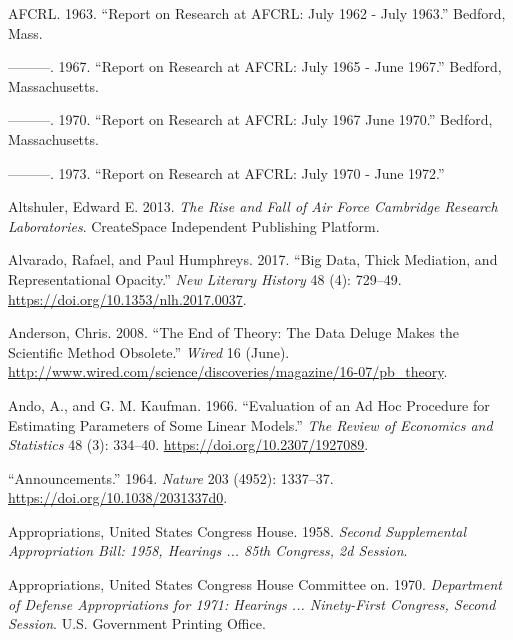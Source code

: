 \documentclass[
  letterpaper,
]{report}
\newlength{\cslhangindent}
\newlength{\cslentryspacingunit} %
\newenvironment{CSLReferences}[2] %
 {%
  \setlength{\parindent}{0pt}
  \ifodd #1
  \let\oldpar\par
  \def\par{\hangindent=\cslhangindent\oldpar}
  \fi
  \setlength{\parskip}{#2\cslentryspacingunit}
 }%
 {}
\begin{document}
\hypertarget{refs}{}
\begin{CSLReferences}{1}{0}
\leavevmode{}%
AFCRL. 1963. {``Report on Research at AFCRL: July 1962 - July 1963.''}
Bedford, Mass.

\leavevmode{}%
---------. 1967. {``Report on Research at AFCRL: July 1965 - June
1967.''} Bedford, Massachusetts.

\leavevmode{}%
---------. 1970. {``Report on Research at AFCRL: July 1967 {\textendash}
June 1970.''} Bedford, Massachusetts.

\leavevmode{}%
---------. 1973. {``Report on Research at AFCRL: July 1970 - June
1972.''}

\leavevmode{}%
Altshuler, Edward E. 2013. \emph{The Rise and Fall of Air Force
Cambridge Research Laboratories}. CreateSpace Independent Publishing
Platform.

\leavevmode{}%
Alvarado, Rafael, and Paul Humphreys. 2017. {``Big Data, Thick
Mediation, and Representational Opacity.''} \emph{New Literary History}
48 (4): 729--49. \url{https://doi.org/10.1353/nlh.2017.0037}.

\leavevmode{}%
Anderson, Chris. 2008. {``The End of Theory: The Data Deluge Makes the
Scientific Method Obsolete.''} \emph{Wired} 16 (June).
\url{http://www.wired.com/science/discoveries/magazine/16-07/pb_theory}.

\leavevmode{}%
Ando, A., and G. M. Kaufman. 1966. {``Evaluation of an Ad Hoc Procedure
for Estimating Parameters of Some Linear Models.''} \emph{The Review of
Economics and Statistics} 48 (3): 334--40.
\url{https://doi.org/10.2307/1927089}.

\leavevmode{}%
{``Announcements.''} 1964. \emph{Nature} 203 (4952): 1337--37.
\url{https://doi.org/10.1038/2031337d0}.

\leavevmode{}%
Appropriations, United States Congress House. 1958. \emph{Second
Supplemental Appropriation Bill: 1958, Hearings ... 85th Congress, 2d
Session}.

\leavevmode{}%
Appropriations, United States Congress House Committee on. 1970.
\emph{Department of Defense Appropriations for 1971: Hearings ...
Ninety-First Congress, Second Session}. U.S. Government Printing Office.


\end{CSLReferences}
\end{document}
